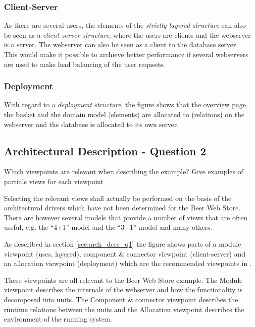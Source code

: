 \subsubsection{Client-Server}

As there are several users, the elements of the
\emph{strictly layered structure} can also be seen as a
\emph{client-server structure}, where the users are clients
and the webserver is a server. The webserver can also be
seen as a client to the database server. This would make it
possible to archieve better performance if several webservers
are used to make load balancing of the user requests.

\subsubsection{Deployment}

With regard to a \emph{deployment structure}, the figure shows
that the overview page, the basket and the domain model (elements)
are allocated to (relations) on the webserver and the database is
allocated to its own server.

\subsection{Architectural Description - Question 2}

\begin{question}
Which viewpoints are relevant when describing the example?
Give examples of partials views for each viewpoint
\end{question}

Selecting the relevant views shall actually be performed on
the basis of the architectural drivers which have not been
determined for the Beer Web Store. There are however several
models that provide a number of views that are often useful,
e.g. the ``4+1'' model \cite{kruchten1995} and the ``3+1''
model \cite{christensen2004archdesc} and many others.

As described in section \ref{sec:arch_desc_q1} the figure shows
parts of a module viewpoint (uses, layered), component \&
connector viewpoint (client-server) and an allocation viewpoint
(deployment) which are the recommended viewpoints in
\cite{christensen2004archdesc}.

These viewpoints are all relevant to the Beer Web Store example.
The Module viewpoint describes the internals of the webserver and how
the functionality is decomposed into units. The Component \& connector
viewpoint describes the runtime relations between the units and the
Allocation viewpoint describes the environment of the running
system.

